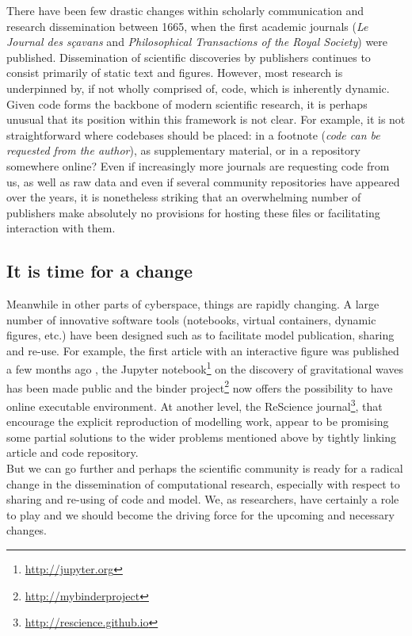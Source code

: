 \documentclass[jou]{apa6}
\begin{document}
There have been few drastic changes within scholarly communication and research dissemination between 1665, when the first academic journals (\textit{Le Journal des sçavans} and \textit{Philosophical Transactions of the Royal Society}) were published.
Dissemination of scientific discoveries by publishers continues to consist primarily of static text and figures.
However, most research is underpinned by, if not wholly comprised of, code, which is inherently dynamic.
Given code forms the backbone of modern scientific research, it is perhaps unusual that its position within this framework is not clear.
For example, it is not straightforward where codebases should be placed: in a footnote ({\em code can be requested from the author}), as supplementary material, or in a repository somewhere online?
Even if increasingly more journals are requesting code from us, as well as raw data and even if several community repositories have appeared over the years, it is nonetheless striking that an overwhelming number of publishers make absolutely no provisions for hosting these files or facilitating interaction with them.


\subsection*{It is time for a change}

Meanwhile in other parts of cyberspace, things are rapidly changing.
A large number of innovative software tools (notebooks, virtual containers, dynamic figures, etc.) have been designed such as to facilitate model publication, sharing and re-use.
For example, the first article with an interactive figure was published a few months ago \cite{ogrean16}, the Jupyter notebook\footnote{\url{http://jupyter.org}} on the discovery of gravitational waves has been made public and the binder project\footnote{\url{http://mybinderproject}} now offers the possibility to have online executable environment.
At another level, the ReScience journal\footnote{\url{http://rescience.github.io}}, that encourage the explicit reproduction of modelling work, appear to be promising some partial solutions to the wider problems mentioned above by tightly linking article and code repository.\\

But we can go further and perhaps the scientific community is ready for a radical change in the dissemination of computational research, especially with respect to sharing and re-using of code and model.
We, as researchers, have certainly a role to play and we should become the driving force for the upcoming and necessary changes.





\hspace*{1cm}
\end{document}
